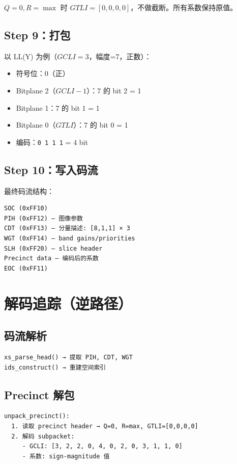$Q=0, R=\max$ 时 $\mathit{GTLI}=[0, 0, 0, 0]$，不做截断。所有系数保持原值。

\subsection{Step 9：打包}

以 LL(Y) 为例（$\mathit{GCLI}=3$，幅度=7，正数）：
\begin{itemize}
  \item 符号位：0（正）
  \item Bitplane 2（$\mathit{GCLI}-1$）：7 的 bit 2 = 1
  \item Bitplane 1：7 的 bit 1 = 1
  \item Bitplane 0（$\mathit{GTLI}$）：7 的 bit 0 = 1
  \item 编码：\texttt{0 1 1 1} = 4 bit
\end{itemize}

\subsection{Step 10：写入码流}

最终码流结构：

\begin{lstlisting}[numbers=none]
SOC (0xFF10)
PIH (0xFF12) — 图像参数
CDT (0xFF13) — 分量描述: [8,1,1] × 3
WGT (0xFF14) — band gains/priorities
SLH (0xFF20) — slice header
Precinct data — 编码后的系数
EOC (0xFF11)
\end{lstlisting}

\section{解码追踪（逆路径）}

\subsection{码流解析}

\begin{lstlisting}[numbers=none]
xs_parse_head() → 提取 PIH, CDT, WGT
ids_construct() → 重建空间索引
\end{lstlisting}

\subsection{Precinct 解包}

\begin{lstlisting}[numbers=none]
unpack_precinct():
  1. 读取 precinct header → Q=0, R=max, GTLI=[0,0,0,0]
  2. 解码 subpacket:
     - GCLI: [3, 2, 2, 0, 4, 0, 2, 0, 3, 1, 1, 0]
     - 系数: sign-magnitude 值
\end{lstlisting}

